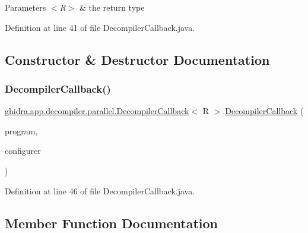 \begin{DoxyParams}{Parameters}
{\em $<$\+R$>$} & the return type \\
\hline
\end{DoxyParams}


Definition at line 41 of file Decompiler\+Callback.\+java.



\subsection{Constructor \& Destructor Documentation}
\mbox{\label{classghidra_1_1app_1_1decompiler_1_1parallel_1_1_decompiler_callback_a7c926a046a5dc4e8021b5120be9391a8}} 
\subsubsection{\texorpdfstring{DecompilerCallback()}{DecompilerCallback()}}
{\footnotesize\ttfamily \mbox{\hyperlink{classghidra_1_1app_1_1decompiler_1_1parallel_1_1_decompiler_callback}{ghidra.\+app.\+decompiler.\+parallel.\+Decompiler\+Callback}}$<$ R $>$.\mbox{\hyperlink{classghidra_1_1app_1_1decompiler_1_1parallel_1_1_decompiler_callback}{Decompiler\+Callback}} (\begin{DoxyParamCaption}\item[{Program}]{program,  }\item[{\mbox{\hyperlink{interfaceghidra_1_1app_1_1decompiler_1_1parallel_1_1_decompile_configurer}{Decompile\+Configurer}}}]{configurer }\end{DoxyParamCaption})\hspace{0.3cm}{\ttfamily [inline]}}



Definition at line 46 of file Decompiler\+Callback.\+java.



\subsection{Member Function Documentation}
\mbox{\label{classghidra_1_1app_1_1decompiler_1_1parallel_1_1_decompiler_callback_a652c2f3d7b74015ec26bedb980920049}} 
